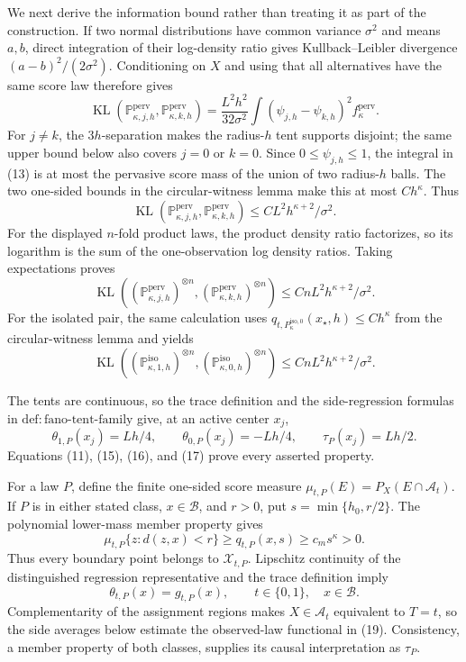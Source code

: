 We next derive the information bound rather than treating it as part of
the construction.  If two normal distributions have common variance
\(\sigma^2\) and means \(a,b\), direct integration of their log-density
ratio gives Kullback--Leibler divergence \((a-b)^2/(2\sigma^2)\).
Conditioning on \(X\) and using that all alternatives have the same score
law therefore gives
\[
 \operatorname{KL}(\mathbb P_{\kappa,j,h}^{\mathrm{perv}},
                    \mathbb P_{\kappa,k,h}^{\mathrm{perv}})
 =\frac{L^2h^2}{32\sigma^2}
   \int(\psi_{j,h}-\psi_{k,h})^2 f_{\kappa}^{\mathrm{perv}}.
 \tag{13}
\]
For \(j\ne k\), the \(3h\)-separation makes the radius-\(h\) tent
supports disjoint; the same upper bound below also covers \(j=0\) or
\(k=0\).  Since \(0\le\psi_{j,h}\le1\), the integral in (13) is at most
the pervasive score mass of the union of two radius-\(h\) balls.  The
two one-sided bounds in the circular-witness lemma make this at most
\(C h^{\kappa}\).  Thus
\[
 \operatorname{KL}(\mathbb P_{\kappa,j,h}^{\mathrm{perv}},
                    \mathbb P_{\kappa,k,h}^{\mathrm{perv}})
 \le C L^2h^{\kappa+2}/\sigma^2.
 \tag{14}
\]
For the displayed \(n\)-fold product laws, the product density ratio
factorizes, so its logarithm is the sum of the one-observation log density
ratios.  Taking expectations proves
\[
 \operatorname{KL}((\mathbb P_{\kappa,j,h}^{\mathrm{perv}})^{\otimes n},
                    (\mathbb P_{\kappa,k,h}^{\mathrm{perv}})^{\otimes n})
 \le CnL^2h^{\kappa+2}/\sigma^2.
 \tag{15}
\]
For the isolated pair, the same calculation uses
\(q_{t,P_{\kappa}^{\mathrm{iso},0}}(x_{\star},h)\le Ch^{\kappa}\)
from the circular-witness lemma and yields
\[
 \operatorname{KL}((\mathbb P_{\kappa,1,h}^{\mathrm{iso}})^{\otimes n},
                    (\mathbb P_{\kappa,0,h}^{\mathrm{iso}})^{\otimes n})
 \le CnL^2h^{\kappa+2}/\sigma^2.
 \tag{16}
\]

The tents are continuous, so the trace definition and the side-regression
formulas in \(\mathrm{def:fano\text{-}tent\text{-}family}\) give, at an
active center \(x_j\),
\[
 \theta_{1,P}(x_j)=Lh/4,
 \qquad \theta_{0,P}(x_j)=-Lh/4,
 \qquad \tau_P(x_j)=Lh/2.
 \tag{17}
\]
Equations (11), (15), (16), and (17) prove every asserted property.

For a law \(P\), define the finite one-sided score measure
\(\mu_{t,P}(E)=P_X(E\cap\mathcal A_t)\).  If \(P\) is in either stated
class, \(x\in\mathcal B\), and \(r>0\), put
\(s=\min\{h_0,r/2\}\).  The polynomial lower-mass member property gives
\[
 \mu_{t,P}\{z:d(z,x)<r\}\ge q_{t,P}(x,s)
 \ge c_ms^{\kappa}>0.
 \tag{18}
\]
Thus every boundary point belongs to \(\mathcal X_{t,P}\).  Lipschitz
continuity of the distinguished regression representative and the trace
definition imply
\[
 \theta_{t,P}(x)=g_{t,P}(x),
 \qquad t\in\{0,1\},\quad x\in\mathcal B.
 \tag{19}
\]
Complementarity of the assignment regions makes \(X\in\mathcal A_t\)
equivalent to \(T=t\), so the side averages below estimate the
observed-law functional in (19).  Consistency, a member property of both
classes, supplies its causal interpretation as \(\tau_P\).

